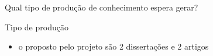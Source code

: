 \begin{frame}{Qual tipo de produção de conhecimento espera gerar?}
    \begin{block}{Tipo de produção}
        \begin{itemize}
            \item o proposto pelo projeto são 2 dissertações e 2 artigos
        \end{itemize}
    \end{block}
\end{frame}
